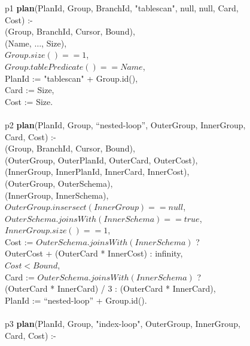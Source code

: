 \begin{figure}
\ssp
\centering
\begin{boxedminipage}{\linewidth}
p1 {\bf plan}(PlanId, Group, BranchId, "tablescan", null, null, Card, Cost) :- \\
(Group, BranchId, Cursor, Bound), \\
(Name, $\ldots$, Size), \\
\datalogspace $Group.size() == 1$, \\
\datalogspace $Group.tablePredicate() == Name$, \\
\datalogspace PlanId := "tablescan" + Group.id(), \\
\datalogspace Card := Size, \\
\datalogspace Cost := Size. \\
\\
p2 {\bf plan}(PlanId, Group, ``nested-loop'', OuterGroup, InnerGroup, Card, Cost) :- \\
(Group, BranchId, Cursor, Bound), \\
(OuterGroup, OuterPlanId, OuterCard, OuterCost), \\
(InnerGroup, InnerPlanId, InnerCard, InnerCost), \\
(OuterGroup, OuterSchema), \\
(InnerGroup, InnerSchema), \\
\datalogspace $OuterGroup.insersect(InnerGroup) ==  null$, \\
\datalogspace $OuterSchema.joinsWith(InnerSchema) ==  true$, \\
\datalogspace $InnerGroup.size() == 1$, \\
\datalogspace Cost := $OuterSchema.joinsWith(InnerSchema)$ ? \\
\datalogspace \datalogspace OuterCost + (OuterCard * InnerCost) : infinity, \\
\datalogspace $Cost < Bound$, \\
\datalogspace Card := $OuterSchema.joinsWith(InnerSchema)$ ? \\
\datalogspace \datalogspace (OuterCard * InnerCard) / 3 : (OuterCard * InnerCard), \\
\datalogspace PlanId := ``nested-loop'' + Group.id(). \\
\\
p3 {\bf plan}(PlanId, Group, "index-loop", OuterGroup, InnerGroup, Card, Cost) :- \\

\end{boxedminipage}
\end{figure}
